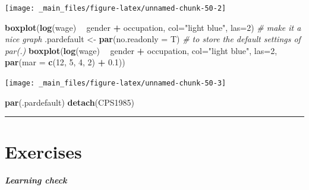 \documentclass[
]{book}
\newenvironment{Shaded}{\begin{snugshade}}{\end{snugshade}}
\newcommand{\CommentTok}[1]{\textcolor[rgb]{0.56,0.35,0.01}{\textit{#1}}}
\newcommand{\DataTypeTok}[1]{\textcolor[rgb]{0.13,0.29,0.53}{#1}}
\newcommand{\DecValTok}[1]{\textcolor[rgb]{0.00,0.00,0.81}{#1}}
\newcommand{\FloatTok}[1]{\textcolor[rgb]{0.00,0.00,0.81}{#1}}
\newcommand{\KeywordTok}[1]{\textcolor[rgb]{0.13,0.29,0.53}{\textbf{#1}}}
\newcommand{\NormalTok}[1]{#1}
\newcommand{\OperatorTok}[1]{\textcolor[rgb]{0.81,0.36,0.00}{\textbf{#1}}}
\newcommand{\StringTok}[1]{\textcolor[rgb]{0.31,0.60,0.02}{#1}}
\begin{document}
\begin{center}\texttt{[image: \_main\_files/figure-latex/unnamed-chunk-50-2]} \end{center}

\begin{Shaded}
\begin{Highlighting}[]
\KeywordTok{boxplot}\NormalTok{(}\KeywordTok{log}\NormalTok{(wage) }\OperatorTok{~}\StringTok{ }\NormalTok{gender }\OperatorTok{+}\StringTok{ }\NormalTok{occupation, }\DataTypeTok{col=}\StringTok{"light blue"}\NormalTok{, }\DataTypeTok{las=}\DecValTok{2}\NormalTok{)}
\CommentTok{# make it a nice graph}
\NormalTok{.pardefault <-}\StringTok{ }\KeywordTok{par}\NormalTok{(}\DataTypeTok{no.readonly =}\NormalTok{ T) }\CommentTok{# to store the default settings of par(.)}
\KeywordTok{boxplot}\NormalTok{(}\KeywordTok{log}\NormalTok{(wage) }\OperatorTok{~}\StringTok{ }\NormalTok{gender }\OperatorTok{+}\StringTok{ }\NormalTok{occupation, }\DataTypeTok{col=}\StringTok{"light blue"}\NormalTok{, }\DataTypeTok{las=}\DecValTok{2}\NormalTok{, }\KeywordTok{par}\NormalTok{(}\DataTypeTok{mar =} \KeywordTok{c}\NormalTok{(}\DecValTok{12}\NormalTok{, }\DecValTok{5}\NormalTok{, }\DecValTok{4}\NormalTok{, }\DecValTok{2}\NormalTok{) }\OperatorTok{+}\StringTok{ }\FloatTok{0.1}\NormalTok{))}
\end{Highlighting}
\end{Shaded}

\begin{center}\texttt{[image: \_main\_files/figure-latex/unnamed-chunk-50-3]} \end{center}

\begin{Shaded}
\begin{Highlighting}[]
\KeywordTok{par}\NormalTok{(.pardefault)}
\KeywordTok{detach}\NormalTok{(CPS1985)}
\end{Highlighting}
\end{Shaded}

\begin{center}\rule{0.5\linewidth}{0.5pt}\end{center}

\hypertarget{exercises}{%
\section{Exercises}\label{exercises}}

\begin{learncheck}
\textbf{\emph{Learning check}}
\end{learncheck}
\end{document}
